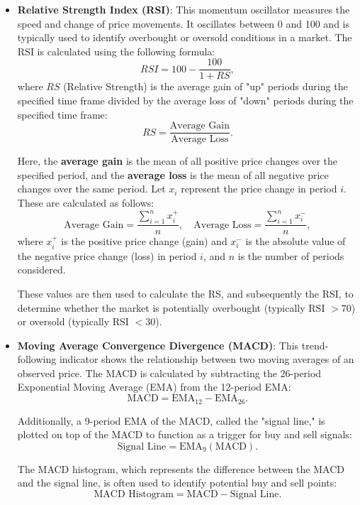 \begin{itemize}
	\item \textbf{Relative Strength Index (RSI)}: This momentum oscillator measures the speed and change of price movements. It oscillates between 0 and 100 and is typically used to identify overbought or oversold conditions in a market. The RSI is calculated using the following formula:
	      \[
		      RSI = 100 - \frac{100}{1 + RS},
	      \]
	      where \( RS \) (Relative Strength) is the average gain of "up" periods during the specified time frame divided by the average loss of "down" periods during the specified time frame:
	      \[
		      RS = \frac{\text{Average Gain}}{\text{Average Loss}}.
	      \]

	      Here, the \textbf{average gain} is the mean of all positive price changes over the specified period, and the \textbf{average loss} is the mean of all negative price changes over the same period. Let \( x_i \) represent the price change in period \( i \). These are calculated as follows:
	      \[
		      \text{Average Gain} = \frac{\sum_{i=1}^{n} x_i^+}{n}, \quad \text{Average Loss} = \frac{\sum_{i=1}^{n} x_i^-}{n},
	      \]
	      where \( x_i^+ \) is the positive price change (gain) and \( x_i^- \) is the absolute value of the negative price change (loss) in period \( i \), and \( n \) is the number of periods considered.

	      These values are then used to calculate the RS, and subsequently the RSI, to determine whether the market is potentially overbought (typically RSI $> 70$) or oversold (typically RSI $< 30$).


	\item \textbf{Moving Average Convergence Divergence (MACD)}: This trend-following indicator shows the relationship between two moving averages of an observed price. The MACD is calculated by subtracting the 26-period Exponential Moving Average (EMA) from the 12-period EMA:
	      \[
		      \text{MACD} = \text{EMA}_{12} - \text{EMA}_{26}.
	      \]

	      Additionally, a 9-period EMA of the MACD, called the "signal line," is plotted on top of the MACD to function as a trigger for buy and sell signals:
	      \[
		      \text{Signal Line} = \text{EMA}_{9}(\text{MACD}).
	      \]

	      The MACD histogram, which represents the difference between the MACD and the signal line, is often used to identify potential buy and sell points:
	      \[
		      \text{MACD Histogram} = \text{MACD} - \text{Signal Line}.
	      \]


\end{itemize}
